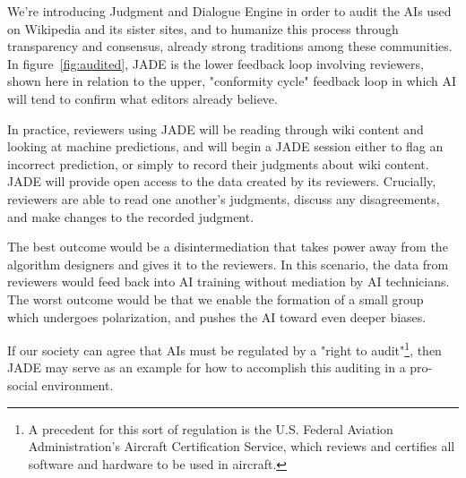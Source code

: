 \documentclass[format=sigconf]{acmart}
\begin{document}
We're introducing Judgment and Dialogue Engine in order to audit the AIs used on Wikipedia and its sister sites, and to humanize this process through transparency and consensus, already strong traditions among these communities.  In figure~\ref{fig:audited}, JADE is the lower feedback loop involving reviewers, shown here in relation to the upper, "conformity cycle" feedback loop in which AI will tend to confirm what editors already believe.

In practice, reviewers using JADE will be reading through wiki content and looking at machine predictions, and will begin a JADE session either to flag an incorrect prediction, or simply to record their judgments about wiki content.  JADE will provide open access to the data created by its reviewers.  Crucially, reviewers are able to read one another's judgments, discuss any disagreements, and make changes to the recorded judgment.

The best outcome would be a disintermediation that takes power away from the algorithm designers and gives it to the reviewers.  In this scenario, the data from reviewers would feed back into AI training without mediation by AI technicians.  The worst outcome would be that we enable the formation of a small group which undergoes polarization, and pushes the AI toward even deeper biases.

If our society can agree that AIs must be regulated by a "right to audit"\footnote{A precedent for this sort of regulation is the U.S. Federal Aviation Administration's Aircraft Certification Service, which reviews and certifies all software and hardware to be used in aircraft.}, then JADE may serve as an example for how to accomplish this auditing in a pro-social environment.


\end{document}
